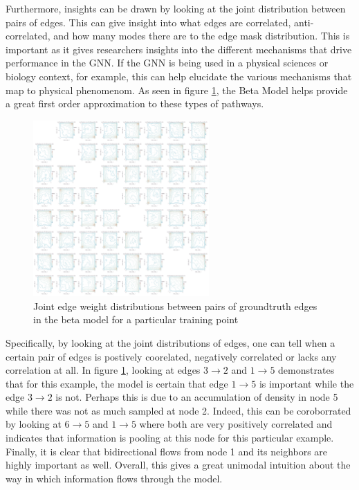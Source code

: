 Furthermore, insights can be drawn by looking at the joint distribution between pairs of edges. This can give insight into what edges are correlated, anti-correlated, and how many modes there are to the edge mask distribution. This is important as it gives researchers insights into the different mechanisms that drive performance in the GNN. If the GNN is being used in a physical sciences or biology context, for example, this can help elucidate the various mechanisms that map to physical phenomenom. As seen in figure \ref{fig:tree-model-beta-joint}, the Beta Model helps provide a great first order approximation to these types of pathways.
\begin{figure}[htb]
	\centering
	\includegraphics[width=0.6\textwidth]{images/tree-model-beta-joint.pdf}
	\caption{Joint edge weight distributions between pairs of groundtruth edges in the beta model for a particular training point}
	\label{fig:tree-model-beta-joint}
\end{figure}

Specifically, by looking at the joint distributions of edges, one can tell when a certain pair of edges is postively coorelated, negatively correlated or lacks any correlation at all. In figure \ref{fig:tree-model-beta-joint}, looking at edges $3 \rightarrow 2$ and $1 \rightarrow 5$ demonstrates that for this example, the model is certain that edge $1 \rightarrow 5$ is important while the edge $3 \rightarrow 2$ is not. Perhaps this is due to an accumulation of density in node 5 while there was not as much sampled at node 2. Indeed, this can be coroborrated by looking at $6 \rightarrow 5$ and $1 \rightarrow 5$ where both are very positively correlated and indicates that information is pooling at this node for this particular example. Finally, it is clear that bidirectional flows from node 1 and its neighbors are highly important as well. Overall, this gives a great unimodal intuition about the way in which information flows through the model.

